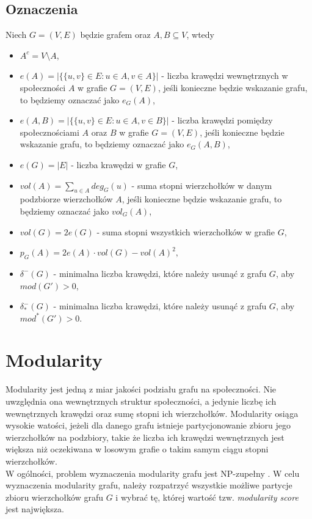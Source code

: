 \documentclass[letterpaper,12pt]{article}
\begin{document}
\subsection{Oznaczenia}
Niech \(G = (V, E)\) będzie grafem oraz \(A, B \subseteq V\), wtedy
\begin{itemize}
  \item \(A^c = V \setminus A\),
  \item \(e(A) = |\{ \{u, v\} \in E : u \in A, v \in A\}|\) - liczba krawędzi wewnętrznych w społeczności \(A\) w grafie \(G=(V,E)\), jeśli konieczne będzie wskazanie grafu, to będziemy oznaczać jako \(e_G(A)\),
  \item \(e(A, B) = |\{ \{u, v\} \in E : u \in A, v \in B\}|\) - liczba krawędzi pomiędzy społecznościami \(A\) oraz \(B\) w grafie \(G=(V,E)\), jeśli konieczne będzie wskazanie grafu, to będziemy oznaczać jako \(e_G(A, B)\),
  \item \(e(G) = |E|\) - liczba krawędzi w grafie \(G\),
  \item \(vol(A) = \sum_{u \in A}deg_G(u)\) - suma stopni wierzchołków w danym podzbiorze wierzchołków \(A\), jeśli konieczne będzie wskazanie grafu, to będziemy oznaczać jako \(vol_G(A)\),
  \item \(vol(G) = 2e(G)\) - suma stopni wszystkich wierzchołków w grafie \(G\),
  \item \(p_G(A) = 2e(A) \cdot vol(G) - {vol(A)}^2,\)
  \item \(\delta^{-}(G)\) - minimalna liczba krawędzi, które należy usunąć z grafu \(G\), aby \(mod(G') > 0\),
  \item \(\delta^{-}_*(G)\) - minimalna liczba krawędzi, które należy usunąć z grafu \(G\), aby \(mod^*(G') > 0\).
\end{itemize}

\section{Modularity}
Modularity jest jedną z miar jakości podziału grafu na społeczności. Nie uwzględnia ona wewnętrznych struktur społeczności, a jedynie liczbę ich wewnętrznych krawędzi oraz sumę stopni ich wierzchołków. Modularity osiąga wysokie watości, jeżeli dla danego grafu istnieje partycjonowanie zbioru jego wierzchołków na podzbiory, takie że liczba ich krawędzi wewnętrznych jest większa niż oczekiwana w losowym grafie o takim samym ciągu stopni wierzchołków.\\
W ogólności, problem wyznaczenia modularity grafu jest NP-zupełny \cite[Section 4]{BD08}.
W celu wyznaczenia modularity grafu, należy rozpatrzyć wszystkie możliwe partycje zbioru wierzchołków grafu \(G\) i wybrać tę, której wartość tzw. \textit{modularity score} jest największa.\\
\end{document}
